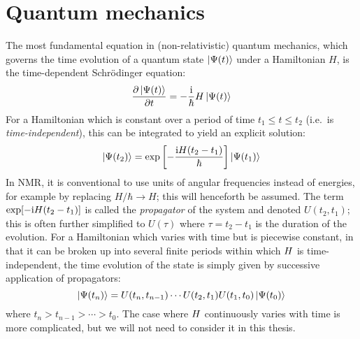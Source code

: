 \section{Quantum mechanics}
\label{sec:theory__quantum_mechanics}

The most fundamental equation in (non-relativistic) quantum mechanics, which governs the time evolution of a quantum state $\ket{\Psi(t)}$ under a Hamiltonian $H$, is the time-dependent Schr\"{o}dinger equation:
\begin{equation}
    \label{eq:tdse}
    \frac{\partial\ket{\Psi(t)}}{\partial t} = -\frac{\mathrm{i}}{\hbar}H\ket{\Psi(t)} 
\end{equation}
For a Hamiltonian which is constant over a period of time $t_1 \leq t \leq t_2$ (i.e.\ is \textit{time-independent}), this can be integrated to yield an explicit solution:
\begin{equation}
    \label{eq:time_evolution}
    \ket{\Psi(t_2)} = \exp\left[-\frac{\mathrm{i} H (t_2 - t_1)}{\hbar}\right]\ket{\Psi(t_1)}
\end{equation}
In NMR, it is conventional to use units of angular frequencies instead of energies, for example by replacing $H/\hbar \to H$; this will henceforth be assumed.
The term $\exp[-\mathrm{i} H(t_2 - t_1)]$ is called the \textit{propagator} of the system and denoted $U(t_2, t_1)$; this is often further simplified to $U(\tau)$ where $\tau = t_2 - t_1$ is the duration of the evolution.
For a Hamiltonian which varies with time but is piecewise constant, in that it can be broken up into several finite periods within which $H\/$ is time-independent, the time evolution of the state is simply given by successive application of propagators:
\begin{equation}
    \label{eq:time_evolution_piecewise}
    \ket{\Psi(t_n)} = U(t_n,t_{n-1})\cdots U(t_2,t_1)U(t_1,t_0) \ket{\Psi(t_0)}
\end{equation}
where $t_n > t_{n-1} > \cdots > t_0$.
The case where $H\/$ continuously varies with time is more complicated, but we will not need to consider it in this thesis.

